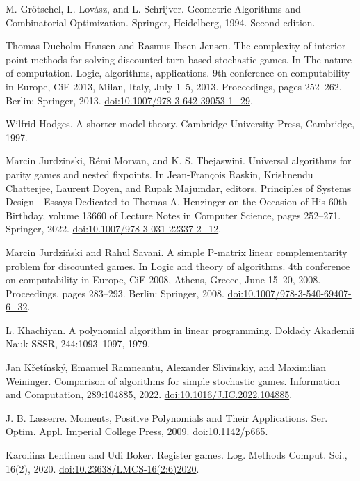  M. Grötschel, L. Lovász, and L. Schrijver. Geometric Algorithms and Combinatorial Optimization. Springer, Heidelberg, 1994. Second edition.

 Thomas Dueholm Hansen and Rasmus Ibsen-Jensen. The complexity of interior point methods for solving discounted turn-based stochastic games. In The nature of computation. Logic, algorithms, applications. 9th conference on computability in Europe, CiE 2013, Milan, Italy, July 1–5, 2013. Proceedings, pages 252–262. Berlin: Springer, 2013. \href{https://doi.org/10.1007/978-3-642-39053-1_29}{doi:10.1007/978-3-642-39053-1\_29}.

 Wilfrid Hodges. A shorter model theory. Cambridge University Press, Cambridge, 1997.

 Marcin Jurdzinski, Rémi Morvan, and K. S. Thejaswini. Universal algorithms for parity games and nested fixpoints. In Jean-François Raskin, Krishnendu Chatterjee, Laurent Doyen, and Rupak Majumdar, editors, Principles of Systems Design - Essays Dedicated to Thomas A. Henzinger on the Occasion of His 60th Birthday, volume 13660 of Lecture Notes in Computer Science, pages 252–271. Springer, 2022. \href{https://doi.org/10.1007/978-3-031-22337-2_12}{doi:10.1007/978-3-031-22337-2\_12}.

 Marcin Jurdziński and Rahul Savani. A simple P-matrix linear complementarity problem for discounted games. In Logic and theory of algorithms. 4th conference on computability in Europe, CiE 2008, Athens, Greece, June 15–20, 2008. Proceedings, pages 283–293. Berlin: Springer, 2008. \href{https://doi.org/10.1007/978-3-540-69407-6_32}{doi:10.1007/978-3-540-69407-6\_32}.

 L. Khachiyan. A polynomial algorithm in linear programming. Doklady Akademii Nauk SSSR, 244:1093–1097, 1979.

 Jan Křetínský, Emanuel Ramneantu, Alexander Slivinskiy, and Maximilian Weininger. Comparison of algorithms for simple stochastic games. Information and Computation, 289:104885, 2022. \href{https://doi.org/10.1016/J.IC.2022.104885}{doi:10.1016/J.IC.2022.104885}.

 J. B. Lasserre. Moments, Positive Polynomials and Their Applications. Ser. Optim. Appl. Imperial College Press, 2009. \href{https://doi.org/10.1142/p665}{doi:10.1142/p665}.

 Karoliina Lehtinen and Udi Boker. Register games. Log. Methods Comput. Sci., 16(2), 2020. \href{https://doi.org/10.23638/LMCS-16(2:6)2020}{doi:10.23638/LMCS-16(2:6)2020}.


